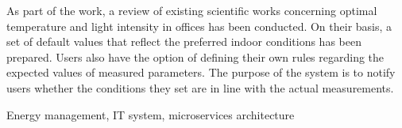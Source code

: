 \documentclass[
    left=2.5cm,         %
    right=2.5cm,        %
    top=2.5cm,          %
    bottom=3cm,         %
    bindingoffset=6mm,  %
    nohyphenation=false %
]{eiti/eiti-thesis}
\begin{document}
As part of the work, a review of existing scientific works concerning optimal
temperature and light intensity in offices has been conducted. On their basis, a set
of default values that reflect the preferred indoor conditions has been prepared.
Users also have the option of defining their own rules regarding the expected
values of measured parameters. The purpose of the system is to notify users
whether the conditions they set are in line with the actual measurements.


\keywords Energy management, IT system, microservices architecture

\cleardoublepage  %
\pagestyle{plain}

\cleardoublepage %
\tableofcontents

\cleardoublepage %
\pagestyle{headings}









\cleardoublepage %
\printbibliography

\newpage
\pagestyle{plain}

\vspace{0.8cm}
\acronymlist
{}
\end{document}
